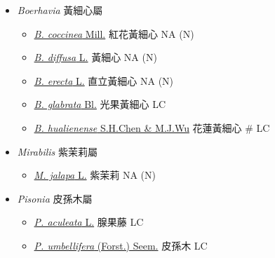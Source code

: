
  \begin{itemize}
 \item[] \textit{Boerhavia} 黃細心屬
                                
  \begin{itemize}
        \item[] \href{http://www.theplantlist.org/tpl1.1/search?q=Boerhavia+coccinea}{\textit{B. coccinea} Mill.}   紅花黃細心   NA (N)
        \item[] \href{http://www.theplantlist.org/tpl1.1/search?q=Boerhavia+diffusa}{\textit{B. diffusa} L.}   黃細心   NA (N)
        \item[] \href{http://www.theplantlist.org/tpl1.1/search?q=Boerhavia+erecta}{\textit{B. erecta} L.}   直立黃細心   NA (N)
        \item[] \href{http://www.theplantlist.org/tpl1.1/search?q=Boerhavia+glabrata}{\textit{B. glabrata} Bl.}   光果黃細心   LC
        \item[] \href{http://www.theplantlist.org/tpl1.1/search?q=Boerhavia+hualienense}{\textit{B. hualienense} S.H.Chen \& M.J.Wu}   花蓮黃細心  \# LC
  \end{itemize}
 \item[] \textit{Mirabilis} 紫茉莉屬
                                
  \begin{itemize}
        \item[] \href{http://www.theplantlist.org/tpl1.1/search?q=Mirabilis+jalapa}{\textit{M. jalapa} L.}   紫茉莉   NA (N)
  \end{itemize}
 \item[] \textit{Pisonia} 皮孫木屬
                                
  \begin{itemize}
        \item[] \href{http://www.theplantlist.org/tpl1.1/search?q=Pisonia+aculeata}{\textit{P. aculeata} L.}   腺果藤   LC
        \item[] \href{http://www.theplantlist.org/tpl1.1/search?q=Pisonia+umbellifera}{\textit{P. umbellifera} (Forst.) Seem.}   皮孫木   LC
  \end{itemize}
  \end{itemize}
